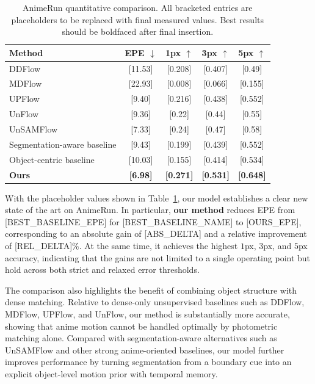 \begin{table}[t]
\centering
\caption{AnimeRun quantitative comparison. All bracketed entries are placeholders to be replaced with final measured values. Best results should be boldfaced after final insertion.}
\label{tab:main_results}
\begin{tabular}{lcccc}
\hline
Method & EPE $\downarrow$ & 1px $\uparrow$ & 3px $\uparrow$ & 5px $\uparrow$ \\
\hline
DDFlow & [11.53] & [0.208] & [0.407] & [0.49] \\
MDFlow & [22.93] & [0.008] & [0.066] & [0.155] \\
UPFlow & [9.40] & [0.216] & [0.438] & [0.552] \\
UnFlow & [9.36] & [0.22] & [0.44] & [0.55] \\
UnSAMFlow & [7.33] & [0.24] & [0.47] & [0.58] \\
Segmentation-aware baseline & [9.43] & [0.199] & [0.439] & [0.552] \\
Object-centric baseline & [10.03] & [0.155] & [0.414] & [0.534] \\
\hline
\textbf{Ours} & \textbf{[6.98]} & \textbf{[0.271]} & \textbf{[0.531]} & \textbf{[0.648]} \\
\hline
\end{tabular}
\end{table}

With the placeholder values shown in Table~\ref{tab:main_results}, our model establishes a clear new state of the art on AnimeRun. In particular, \textbf{our method} reduces EPE from [BEST\_BASELINE\_EPE] for [BEST\_BASELINE\_NAME] to [OURS\_EPE], corresponding to an absolute gain of [ABS\_DELTA] and a relative improvement of [REL\_DELTA]\%. At the same time, it achieves the highest $1$px, $3$px, and $5$px accuracy, indicating that the gains are not limited to a single operating point but hold across both strict and relaxed error thresholds.

The comparison also highlights the benefit of combining object structure with dense matching. Relative to dense-only unsupervised baselines such as DDFlow, MDFlow, UPFlow, and UnFlow, our method is substantially more accurate, showing that anime motion cannot be handled optimally by photometric matching alone. Compared with segmentation-aware alternatives such as UnSAMFlow and other strong anime-oriented baselines, our model further improves performance by turning segmentation from a boundary cue into an explicit object-level motion prior with temporal memory.

